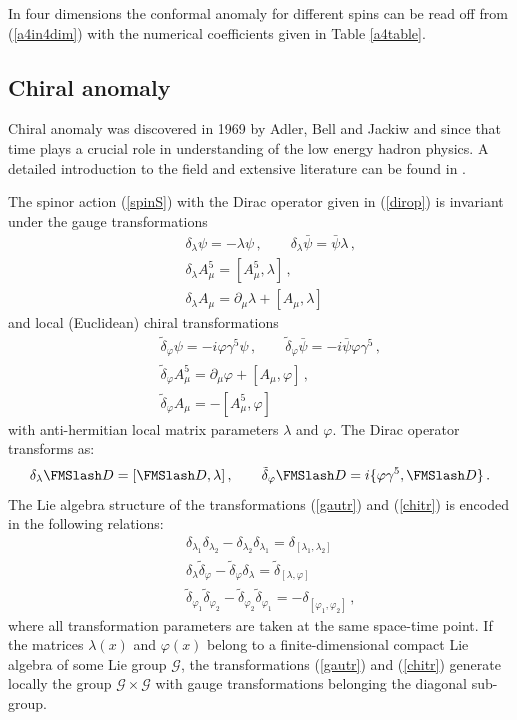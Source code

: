 In four dimensions the conformal anomaly for different spins can be read off
from (\ref{a4in4dim}) with the numerical coefficients given 
in Table \ref{a4table}.
\subsection{Chiral anomaly}\label{s7chiral}
Chiral anomaly was discovered in 1969 by Adler, Bell
and Jackiw \cite{Adler:1969gk,Bell:1969ts} and since
that time plays a crucial role in understanding of the
low energy hadron physics. A detailed introduction
to the field and extensive literature can be found
in \cite{Bertlmann:1996,Zinn-Justin:2002vj}.

The spinor action (\ref{spinS}) with the Dirac operator
given in (\ref{dirop}) is invariant under the gauge
transformations
\begin{eqnarray}
&&\delta_\lambda \psi = -\lambda\psi\,,\qquad
\delta_\lambda \bar \psi = \bar\psi \lambda \,,\nonumber \\
&&\delta_\lambda A_\mu^5 =[A_\mu^5,\lambda ]\,,\nonumber \\
&&\delta_\lambda A_\mu = \partial_\mu \lambda +[A_\mu ,\lambda ]
\label{gautr}
\end{eqnarray}
and local (Euclidean) chiral transformations
\begin{eqnarray}
&&\tilde\delta_\varphi \psi =-i\varphi \gamma^5\psi \,,\qquad
\tilde\delta_\varphi \bar \psi =-i\bar\psi \varphi \gamma^5
\,,\nonumber \\
&&\tilde\delta_\varphi A_\mu^5 =\partial_\mu \varphi +
[A_\mu ,\varphi ] \,,\nonumber \\
&&\tilde\delta_\varphi A_\mu = -[A_\mu^5,\varphi ] 
\label{chitr}
\end{eqnarray}
with anti-hermitian local matrix parameters $\lambda$ and
$\varphi$. The Dirac operator transforms as:
\begin{equation}
\delta_\lambda \Dir=[\Dir ,\lambda ]\,,\qquad
\tilde\delta_\varphi \Dir =i\{ \varphi \gamma^5,\Dir \} \,.
\label{transP}
\end{equation}
The Lie algebra structure of the transformations
(\ref{gautr}) and (\ref{chitr}) is encoded in the following
relations:
\begin{eqnarray}
&&\delta_{\lambda_1}\delta_{\lambda_2} -
\delta_{\lambda_2}\delta_{\lambda_1} 
=\delta_{[\lambda_1 , \lambda_2]} \label{gau-gau}\\
&&\delta_{\lambda}\tilde\delta_{\varphi} -
\tilde\delta_{\varphi} \delta_{\lambda}=
\tilde\delta_{[\lambda ,\varphi ]} \label{gau-chi}\\
&&\tilde\delta_{\varphi_1} \tilde\delta_{\varphi_2}-
\tilde\delta_{\varphi_2}\tilde\delta_{\varphi_1}
=-\delta_{[\varphi_1,\varphi_2]}\,, \label{chi-chi}
\end{eqnarray}
where all transformation parameters are taken at the same
space-time point. If the matrices $\lambda (x)$ and
$\varphi (x)$ belong to a finite-dimensional compact
Lie algebra of some Lie group $\mathcal{G}$, the transformations
(\ref{gautr}) and (\ref{chitr}) generate locally
the group $\mathcal{G}\times \mathcal{G}$ with gauge transformations
belonging the diagonal sub-group.

